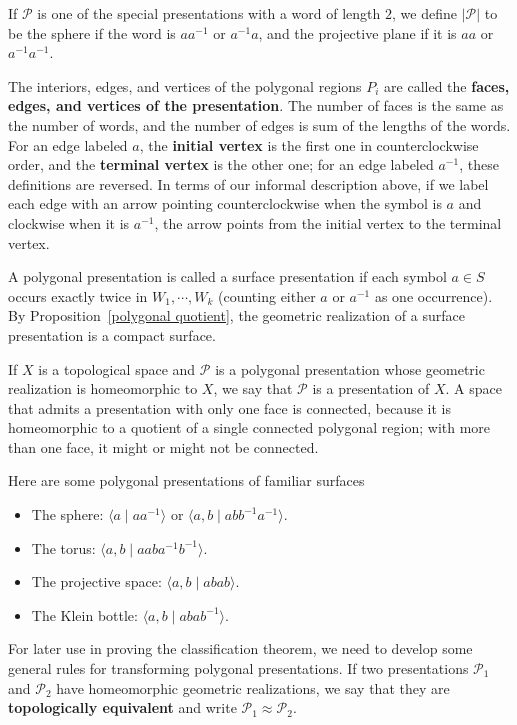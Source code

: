 If $\mathcal{P}$ is one of the special presentations with a word of length $2$, we define $|\mathcal{P}|$ to be the sphere if the word is $aa^{-1}$ or $a^{-1}a$, and the projective plane if it is $aa$ or $a^{-1}a^{-1}$.\par
The interiors, edges, and vertices of the polygonal regions $P_i$ are called the \textbf{faces, edges, and vertices of the presentation}. The number of faces is the same as the number of words, and the number of edges is sum of the lengths of the words. For an edge labeled $a$, the \textbf{initial vertex} is the first one in counterclockwise order, and the \textbf{terminal vertex} is the other one; for an edge labeled $a^{-1}$, these definitions are reversed. In terms of our informal description above, if we label each edge with an arrow pointing counterclockwise when the symbol is $a$ and clockwise when it is $a^{-1}$, the arrow points from the initial vertex to the terminal vertex.\par
A polygonal presentation is called a surface presentation if each symbol $a\in S$
occurs exactly twice in $W_1,\cdots,W_k$ (counting either $a$ or $a^{-1}$ as one occurrence). By Proposition~\ref{polygonal quotient}, the geometric realization of a surface presentation is a compact surface.\par
If $X$ is a topological space and $\mathcal{P}$ is a polygonal presentation whose geometric realization is homeomorphic to $X$, we say that $\mathcal{P}$ is a presentation of $X$. A space that admits a presentation with only one face is connected, because it is homeomorphic to a quotient of a single connected polygonal region; with more than one face, it might or might not be connected.
\begin{example}
Here are some polygonal presentations of familiar surfaces
\begin{itemize}
\item The sphere: $\langle a\mid aa^{-1}\rangle$ or $\langle a,b\mid abb^{-1}a^{-1}\rangle$.
\item The torus: $\langle a,b\mid aaba^{-1}b^{-1}\rangle$.
\item The projective space: $\langle a,b\mid abab\rangle$.
\item The Klein bottle: $\langle a,b\mid abab^{-1}\rangle$.
\end{itemize}
\end{example}
For later use in proving the classification theorem, we need to develop some general rules for transforming polygonal presentations. If two presentations $\mathcal{P}_1$ and $\mathcal{P}_2$ have homeomorphic geometric realizations, we say that they are \textbf{topologically equivalent} and write $\mathcal{P}_1\approx\mathcal{P}_2$.\par
